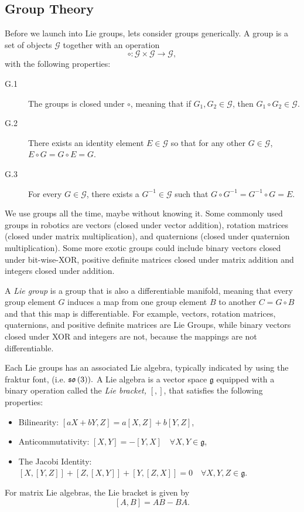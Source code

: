 \subsection{Group Theory}

Before we launch into Lie groups, lets consider groups generically.
A group is a set of objects $\mathcal{G}$ together with an operation 
\[
\circ: \mathcal{G} \times \mathcal{G} \to \mathcal{G},
\]
with the following properties:
\begin{description}
\item[G.1] The groups is closed under $\circ$, meaning that if $G_1, G_2\in\mathcal{G}$, then $G_1\circ G_2\in \mathcal{G}$.
\item[G.2] There exists an identity element $E\in\mathcal{G}$ so that for any other $G\in\mathcal{G}$, $E\circ G = G\circ E = G$.
\item[G.3] For every $G\in\mathcal{G}$, there exists a $G^{-1}\in\mathcal{G}$ such that $G\circ G^{-1}=G^{-1}\circ G = E$.	
\end{description}

We use groups all the time, maybe without knowing it. Some commonly
used groups in robotics are vectors (closed under vector addition),
rotation matrices (closed under matrix multiplication), and quaternions
(closed under quaternion multiplication). Some more exotic groups
could include binary vectors closed under bit-wise-XOR, positive definite
matrices closed under matrix addition and integers closed under addition.

A {\em Lie group} is a group that is also a differentiable manifold, meaning that every group element $G$ induces a map from one group element \textbf{$B$} to another $C=G\circ B$ and that this map is differentiable. For example, vectors, rotation matrices, quaternions, and positive definite matrices are Lie Groups, while binary vectors closed under XOR and integers are not, because the mappings are not differentiable.

Each Lie groups has an associated Lie algebra, typically indicated by using the fraktur font, (i.e. $\mathfrak{so}\left(3\right)).$ A Lie algebra is a vector space $\mathfrak{g}$ equipped with a binary operation
called the \emph{Lie bracket,} $[,]$, that satisfies the following properties:
\begin{itemize}
\item Bilinearity: $\left[aX+bY,Z\right]=a\left[X,Z\right]+b\left[Y,Z\right]$,
\item Anticommutativity: $\left[X,Y\right]=-\left[Y,X\right]\quad\forall X,Y\in\mathfrak{g}$,
\item The Jacobi Identity: $\left[X,\left[Y,Z\right]\right]+\left[Z,\left[X,Y\right]\right]+\left[Y,\left[Z,X\right]\right]=0\quad\forall X,Y,Z\in\mathfrak{g}$.
\end{itemize}
For matrix Lie algebras, the Lie bracket is given by
\[
\left[A,B\right]=AB-BA.
\]

